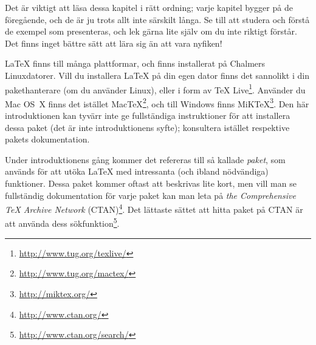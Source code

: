 \documentclass[10pt,../../a4.tex]{subfiles}
\begin{document}
Det är viktigt att läsa dessa kapitel i rätt ordning; varje kapitel bygger på de
föregående, och de är ju trots allt inte särskilt långa. Se till att
studera och förstå de exempel som presenteras, och lek gärna lite själv
om du inte riktigt förstår. Det finns inget bättre sätt att lära sig än
att vara nyfiken!

\LaTeX{} finns till många plattformar, och finns installerat på Chalmers
Linux\-da\-to\-rer. Vill du installera \LaTeX{} på din egen dator finns det
sannolikt i din pakethanterare (om du använder Linux), eller i form
av \TeX{} Live\footnote{\url{http://www.tug.org/texlive/}}. Använder du
Mac OS~X finns det istället
Mac\TeX\footnote{\url{http://www.tug.org/mactex/}}, och till Windows finns
MiK\TeX\footnote{\url{http://miktex.org/}}. Den här introduktionen kan
tyvärr inte ge fullständiga instruktioner för att installera dessa paket
(det är inte introduktionens syfte);
konsultera istället respektive pakets dokumentation.

Under introduktionens gång kommer det refereras till så kallade
\emph{paket}, som används för att utöka \LaTeX{} med intressanta (och
ibland nödvändiga) funktioner. Dessa paket kommer oftast att beskrivas
lite kort, men vill man se fullständig dokumentation för varje paket
kan man leta på \emph{the Comprehensive \TeX{} Archive Network}
(CTAN)\footnote{\url{http://www.ctan.org/}\label{sec:ctan}}.
Det lättaste sättet att hitta paket på CTAN är att använda dess
sökfunktion\footnote{\url{http://www.ctan.org/search/}}.
\end{document}
